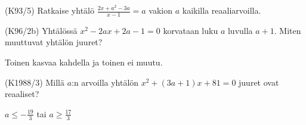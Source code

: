 \begin{multicols}{2}
\begin{tehtava}
(K93/5) Ratkaise yhtälö
        $\frac{2x+a^2-3a}{x-1}=a$ vakion $a$ kaikilla reaaliarvoilla.
\begin{vastaus}
    \end{vastaus}
\end{tehtava}

\begin{tehtava}
(K96/2b) Yhtälössä $x^2-2ax+2a-1=0$ korvataan luku $a$ luvulla $a+1$. Miten muuttuvat yhtälön juuret?
\begin{vastaus}
     Toinen kasvaa kahdella ja toinen ei muutu.
    \end{vastaus}
\end{tehtava}

\begin{tehtava}
(K1988/3) Millä $a$:n arvoilla yhtälön $x^2+(3a+1)x+81=0$ juuret ovat reaaliset?
\begin{vastaus}
$a \leq -\frac{19}{3}$ tai $a \geq \frac{17}{3}$
\end{vastaus}
\end{tehtava}

\end{multicols}

